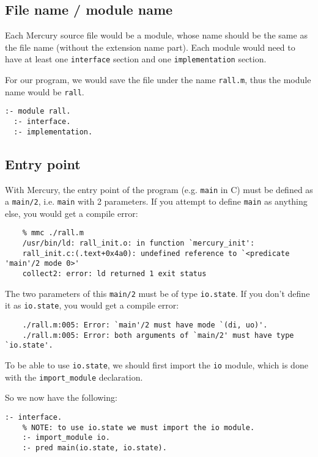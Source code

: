 \subsection{File name / module name}
\label{sec:orgc9a69eb}

Each Mercury source file would be a module, whose name should be the same as the file name (without the extension name part). Each module would need to have at least one \texttt{interface} section and one \texttt{implementation} section.

For our program, we would save the file under the name \texttt{rall.m}, thus the module name would be \texttt{rall}.

\begin{lstlisting}[language=Mercury]
  :- module rall.
  :- interface.
  :- implementation.
\end{lstlisting}

\subsection{Entry point}
\label{sec:orgb9eafbb}

With Mercury, the entry point of the program (e.g. \texttt{main} in C) must be defined as a \texttt{main/2}, i.e. \texttt{main} with 2 parameters. If you attempt to define \texttt{main} as anything else, you would get a compile error:

\begin{lstlisting}
	% mmc ./rall.m
	/usr/bin/ld: rall_init.o: in function `mercury_init':
	rall_init.c:(.text+0x4a0): undefined reference to `<predicate 'main'/2 mode 0>'
	collect2: error: ld returned 1 exit status
\end{lstlisting}

The two parameters of this \texttt{main/2} must be of type \texttt{io.state}. If you don't define it as \texttt{io.state}, you would get a compile error:

\begin{lstlisting}
	./rall.m:005: Error: `main'/2 must have mode `(di, uo)'.
	./rall.m:005: Error: both arguments of `main/2' must have type `io.state'.
\end{lstlisting}

To be able to use \texttt{io.state}, we should first import the \texttt{io} module, which is done with the \texttt{import\_module} declaration.

So we now have the following:

\begin{lstlisting}[language=Mercury]
	:- interface.
	% NOTE: to use io.state we must import the io module.
	:- import_module io.
	:- pred main(io.state, io.state).
\end{lstlisting}

